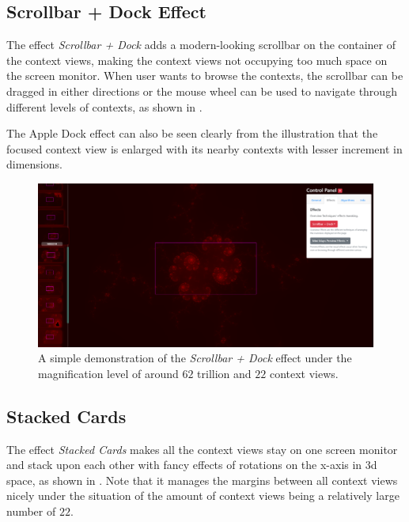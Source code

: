 \subsection{Scrollbar + Dock Effect}
\label{chap5:scrollbar}

The effect \emph{Scrollbar + Dock} adds a modern-looking scrollbar on the container of the context views, making the context views not occupying too much space on the screen monitor. When user wants to browse the contexts, the scrollbar can be dragged in either directions or the mouse wheel can be used to navigate through different levels of contexts, as shown in .

The Apple Dock effect can also be seen clearly from the illustration that the focused context view is enlarged with its nearby contexts with lesser increment in dimensions.

\begin{figure}[H]
\centering
\includegraphics[width=\textwidth,keepaspectratio]{Figures/Chapter5/scrollbar.png}
\decoRule
\caption[Scrollbar + Dock Effect]{A simple demonstration of the \emph{Scrollbar + Dock} effect under the magnification level of around $62$ trillion and $22$ context views.}
\label{fig:chap5:scrollbar}
\end{figure}

\subsection{Stacked Cards}
\label{chap5:cards}

The effect \emph{Stacked Cards} makes all the context views stay on one screen monitor and stack upon each other with fancy effects of rotations on the x-axis in 3d space, as shown in . Note that it manages the margins between all context views nicely under the situation of the amount of context views being a relatively large number of $22$.

